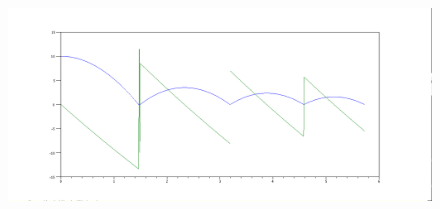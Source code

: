 \documentclass{article}
\begin{document}
\begin{figure}[H]
\includegraphics[width=\textwidth]{img/ej08.png}
\caption{}
\end{figure}
\end{document}
